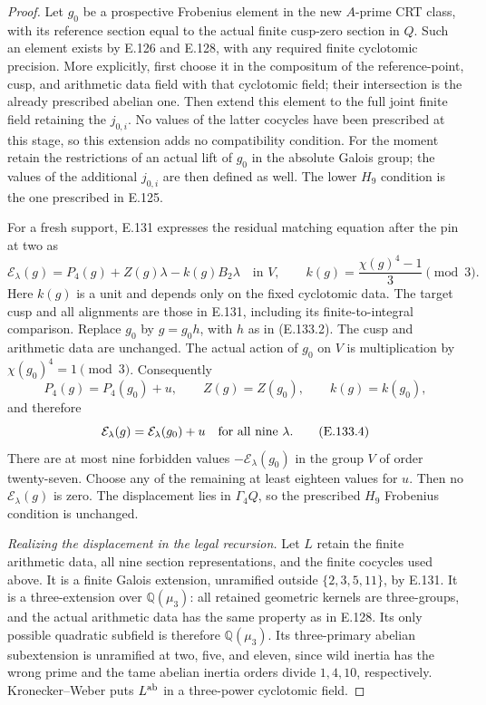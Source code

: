 \begin{proof}
Let $g_0$ be a prospective Frobenius element in the
new $A$-prime CRT class, with its reference section
equal to the actual finite cusp-zero section in
$Q$. Such an element exists by E.126 and E.128,
with any required finite cyclotomic precision.
More explicitly, first choose it in the compositum
of the reference-point, cusp, and arithmetic data
field with that cyclotomic field; their intersection
is the already prescribed abelian one. Then extend
this element to the full joint finite field retaining
the $j_{0,i}$. No values of the latter cocycles have
been prescribed at this stage, so this extension
adds no compatibility condition.
For the moment retain the restrictions of an
actual lift of $g_0$ in the absolute Galois group;
the values of the additional $j_{0,i}$ are then
defined as well. The lower $H_9$ condition is the
one prescribed in E.125.

For a fresh support, E.131 expresses the residual
matching equation after the pin at two as
\[
 \mathcal E_\lambda(g)=P_4(g)+Z(g)\lambda
                           -k(g)B_2\lambda
                         \quad\text{in }V,
 \qquad k(g)=\frac{\chi(g)^4-1}{3}\pmod3.
 \tag{E.133.3}
\]
Here $k(g)$ is a unit and depends only on the
fixed cyclotomic data. The target cusp and all
alignments are those in E.131, including its
finite-to-integral comparison.
Replace $g_0$ by $g=g_0h$, with $h$ as in
(E.133.2). The cusp and arithmetic data are
unchanged. The actual action of $g_0$ on $V$
is multiplication by $\chi(g_0)^4=1\pmod3$.
Consequently
\[
 P_4(g)=P_4(g_0)+u,
 \qquad Z(g)=Z(g_0),\qquad k(g)=k(g_0),
\]
and therefore
\[
              \mathcal E_\lambda(g)
                   =\mathcal E_\lambda(g_0)+u
                   \quad\hbox{for all nine }\lambda.
 \tag{E.133.4}
\]
There are at most nine forbidden values
$-\mathcal E_\lambda(g_0)$ in the group $V$ of
order twenty-seven. Choose any of the remaining
at least eighteen values for $u$. Then no
$\mathcal E_\lambda(g)$ is zero.
The displacement lies in $\Gamma_4Q$, so the
prescribed $H_9$ Frobenius condition is unchanged.

\emph{Realizing the displacement in the legal recursion.}
Let $L$ retain the finite arithmetic data, all nine
section representations, and the finite cocycles
used above. It is a finite Galois extension,
unramified outside $\{2,3,5,11\}$, by E.131.
It is a three-extension over $\mathbb Q(\mu_3)$:
all retained geometric kernels are three-groups,
and the actual arithmetic data has the same
property as in E.128.
Its only possible quadratic subfield is therefore
$\mathbb Q(\mu_3)$. Its three-primary abelian
subextension is unramified at two, five, and
eleven, since wild inertia has the wrong prime
and the tame abelian inertia orders divide
$1,4,10$, respectively. Kronecker--Weber puts
$L^{\rm ab}$ in a three-power cyclotomic field.


\end{proof}
